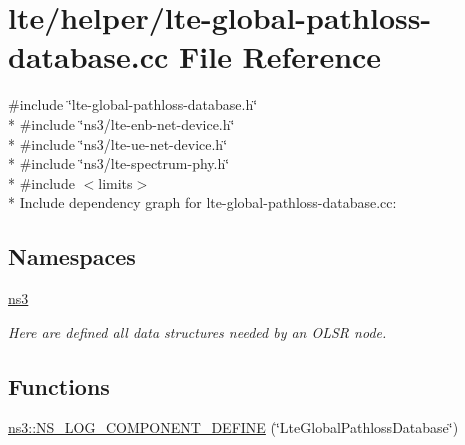 \hypertarget{lte-global-pathloss-database_8cc}{}\section{lte/helper/lte-\/global-\/pathloss-\/database.cc File Reference}
\label{lte-global-pathloss-database_8cc}
{\ttfamily \#include \char`\"{}lte-\/global-\/pathloss-\/database.\+h\char`\"{}}\\*
{\ttfamily \#include \char`\"{}ns3/lte-\/enb-\/net-\/device.\+h\char`\"{}}\\*
{\ttfamily \#include \char`\"{}ns3/lte-\/ue-\/net-\/device.\+h\char`\"{}}\\*
{\ttfamily \#include \char`\"{}ns3/lte-\/spectrum-\/phy.\+h\char`\"{}}\\*
{\ttfamily \#include $<$limits$>$}\\*
Include dependency graph for lte-\/global-\/pathloss-\/database.cc\+:
\subsection*{Namespaces}
\begin{DoxyCompactItemize}
\item 
 \hyperlink{namespacens3}{ns3}
\begin{DoxyCompactList}\small\item\em Here are defined all data structures needed by an O\+L\+SR node. \end{DoxyCompactList}\end{DoxyCompactItemize}
\subsection*{Functions}
\begin{DoxyCompactItemize}
\item 
\hyperlink{namespacens3_a02a28708e1c4468dcee0b656d1146dbe}{ns3\+::\+N\+S\+\_\+\+L\+O\+G\+\_\+\+C\+O\+M\+P\+O\+N\+E\+N\+T\+\_\+\+D\+E\+F\+I\+NE} (\char`\"{}Lte\+Global\+Pathloss\+Database\char`\"{})
\end{DoxyCompactItemize}
